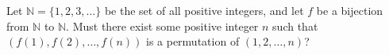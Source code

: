 Let $\mathbb{N} = \{1, 2, 3, \dots\}$ be the set of all positive integers, and let $f$ be a bijection from $\mathbb{N}$ to $\mathbb{N}$. Must there exist some positive integer $n$ such that $(f(1), f(2), \dots, f(n))$ is a permutation of $(1, 2, \dots, n)$?